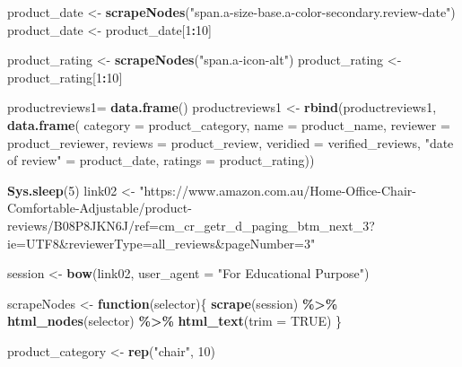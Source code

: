 \documentclass[
]{article}
\newenvironment{Shaded}{\begin{snugshade}}{\end{snugshade}}
\newcommand{\AttributeTok}[1]{\textcolor[rgb]{0.13,0.29,0.53}{#1}}
\newcommand{\ConstantTok}[1]{\textcolor[rgb]{0.56,0.35,0.01}{#1}}
\newcommand{\ControlFlowTok}[1]{\textcolor[rgb]{0.13,0.29,0.53}{\textbf{#1}}}
\newcommand{\DecValTok}[1]{\textcolor[rgb]{0.00,0.00,0.81}{#1}}
\newcommand{\FunctionTok}[1]{\textcolor[rgb]{0.13,0.29,0.53}{\textbf{#1}}}
\newcommand{\NormalTok}[1]{#1}
\newcommand{\OtherTok}[1]{\textcolor[rgb]{0.56,0.35,0.01}{#1}}
\newcommand{\SpecialCharTok}[1]{\textcolor[rgb]{0.81,0.36,0.00}{\textbf{#1}}}
\newcommand{\StringTok}[1]{\textcolor[rgb]{0.31,0.60,0.02}{#1}}
\begin{document}
\begin{Shaded}
\begin{Highlighting}[]
\NormalTok{  product\_date }\OtherTok{\textless{}{-}} \FunctionTok{scrapeNodes}\NormalTok{(}\StringTok{"span.a{-}size{-}base.a{-}color{-}secondary.review{-}date"}\NormalTok{)}
\NormalTok{  product\_date }\OtherTok{\textless{}{-}}\NormalTok{ product\_date[}\DecValTok{1}\SpecialCharTok{:}\DecValTok{10}\NormalTok{]}
  
\NormalTok{  product\_rating }\OtherTok{\textless{}{-}} \FunctionTok{scrapeNodes}\NormalTok{(}\StringTok{"span.a{-}icon{-}alt"}\NormalTok{)}
\NormalTok{  product\_rating }\OtherTok{\textless{}{-}}\NormalTok{ product\_rating[}\DecValTok{1}\SpecialCharTok{:}\DecValTok{10}\NormalTok{]}
  
\NormalTok{  productreviews1}\OtherTok{=} \FunctionTok{data.frame}\NormalTok{()}
\NormalTok{  productreviews1 }\OtherTok{\textless{}{-}} \FunctionTok{rbind}\NormalTok{(productreviews1, }\FunctionTok{data.frame}\NormalTok{(}
                      \AttributeTok{category =}\NormalTok{ product\_category,}
                      \AttributeTok{name =}\NormalTok{ product\_name,}
                      \AttributeTok{reviewer =}\NormalTok{ product\_reviewer,}
                      \AttributeTok{reviews =}\NormalTok{ product\_review,}
                      \AttributeTok{veridied =}\NormalTok{ verified\_reviews,}
                      \StringTok{"date of review"} \OtherTok{=}\NormalTok{ product\_date,}
                      \AttributeTok{ratings =}\NormalTok{ product\_rating))}

  
 \FunctionTok{Sys.sleep}\NormalTok{(}\DecValTok{5}\NormalTok{)}
\NormalTok{link02 }\OtherTok{\textless{}{-}} \StringTok{"https://www.amazon.com.au/Home{-}Office{-}Chair{-}Comfortable{-}Adjustable/product{-}reviews/B08P8JKN6J/ref=cm\_cr\_getr\_d\_paging\_btm\_next\_3?ie=UTF8\&reviewerType=all\_reviews\&pageNumber=3"}


\NormalTok{  session }\OtherTok{\textless{}{-}} \FunctionTok{bow}\NormalTok{(link02,}
               \AttributeTok{user\_agent =} \StringTok{"For Educational Purpose"}\NormalTok{)}

\NormalTok{  scrapeNodes }\OtherTok{\textless{}{-}} \ControlFlowTok{function}\NormalTok{(selector)\{}
    \FunctionTok{scrape}\NormalTok{(session) }\SpecialCharTok{\%\textgreater{}\%}
      \FunctionTok{html\_nodes}\NormalTok{(selector) }\SpecialCharTok{\%\textgreater{}\%}
      \FunctionTok{html\_text}\NormalTok{(}\AttributeTok{trim =} \ConstantTok{TRUE}\NormalTok{)}
\NormalTok{  \}}

\NormalTok{  product\_category }\OtherTok{\textless{}{-}} \FunctionTok{rep}\NormalTok{(}\StringTok{"chair"}\NormalTok{, }\DecValTok{10}\NormalTok{)}


\end{Highlighting}
\end{Shaded}
\end{document}
